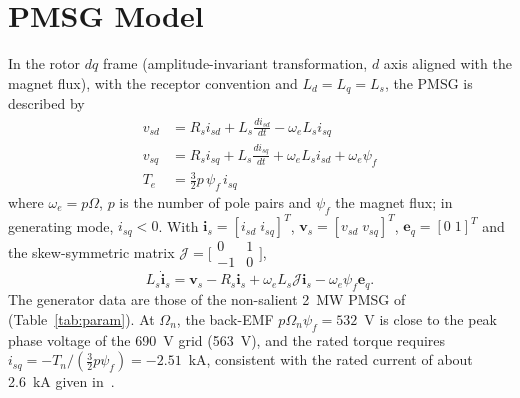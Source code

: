 \documentclass[conference]{IEEEtran}
\newcommand{\bv}[1]{\mathbf{#1}}
\newcommand{\Jm}{\boldsymbol{\mathcal{J}}}
\begin{document}
\section{PMSG Model}
In the rotor $dq$ frame (amplitude-invariant transformation, $d$ axis aligned with the magnet flux),
with the receptor convention and $L_d=L_q=L_s$, the PMSG is described by~\cite{aimene2022}
\begin{align}
v_{sd} &= R_s i_{sd} + L_s\frac{di_{sd}}{dt} - \omega_e L_s i_{sq}\label{eq:vsd}\\
v_{sq} &= R_s i_{sq} + L_s\frac{di_{sq}}{dt} + \omega_e L_s i_{sd} + \omega_e\psi_f\label{eq:vsq}\\
T_e &= \tfrac32 p\,\psi_f\, i_{sq}\label{eq:te}
\end{align}
where $\omega_e=p\Omega$, $p$ is the number of pole pairs and $\psi_f$ the magnet flux; in generating
mode, $i_{sq}<0$. With $\bv{i}_s=[i_{sd}\;i_{sq}]^T$, $\bv{v}_s=[v_{sd}\;v_{sq}]^T$, $\bv{e}_q=[0\;1]^T$
and the skew-symmetric matrix $\Jm=\bigl[\begin{smallmatrix}0&1\\-1&0\end{smallmatrix}\bigr]$,
\begin{equation}
L_s\dot{\bv{i}}_s = \bv{v}_s - R_s\bv{i}_s + \omega_eL_s\Jm\bv{i}_s - \omega_e\psi_f\bv{e}_q .
\label{eq:pmsg}
\end{equation}
The generator data are those of the non-salient 2~MW PMSG of~\cite{hasan2021} (Table~\ref{tab:param}).
At $\Omega_n$, the back-EMF $p\Omega_n\psi_f=532$~V is close to the peak phase voltage of the 690~V
grid (563~V), and the rated torque requires $i_{sq}=-T_n/(\frac32p\psi_f)=-2.51$~kA, consistent with
the rated current of about 2.6~kA given in~\cite{hasan2021}.
\end{document}
